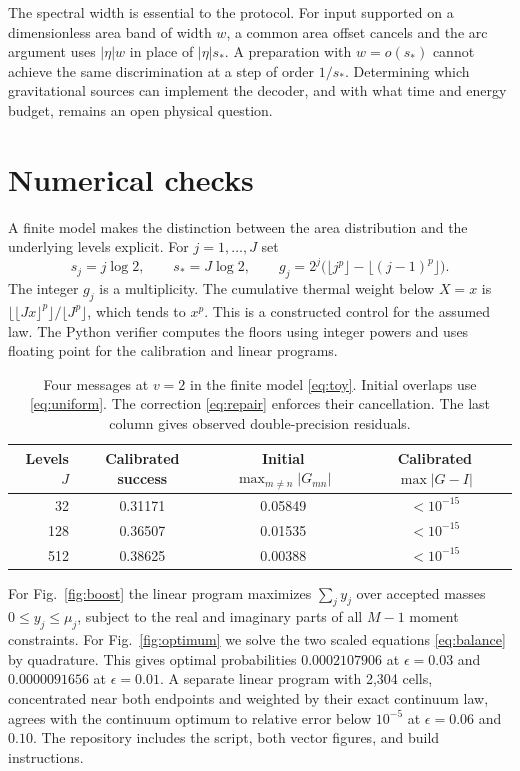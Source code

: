 \documentclass[11pt,letterpaper]{article}
\newcommand{\sg}{s_*}
\begin{document}
The spectral width is essential to the protocol. For input supported on a dimensionless area band of width $w$, a common area offset cancels and the arc argument uses $|\eta|w$ in place of $|\eta|\sg$. A preparation with $w=o(\sg)$ cannot achieve the same discrimination at a step of order $1/\sg$. Determining which gravitational sources can implement the decoder, and with what time and energy budget, remains an open physical question.

\section{Numerical checks}\label{sec:numerics}
A finite model makes the distinction between the area distribution and the underlying levels explicit. For $j=1,\ldots,J$ set
\begin{equation}\label{eq:toy}
 s_j=j\log2,\qquad \sg=J\log2,\qquad
 g_j=2^j\big(\lfloor j^p\rfloor-\lfloor(j-1)^p\rfloor\big).
\end{equation}
The integer $g_j$ is a multiplicity. The cumulative thermal weight below $X=x$ is $\lfloor\lfloor Jx\rfloor^p\rfloor/\lfloor J^p\rfloor$, which tends to $x^p$. This is a constructed control for the assumed law. The Python verifier computes the floors using integer powers and uses floating point for the calibration and linear programs.

\begin{table}[htbp]
\centering\small
\begin{tabular}{rccc}
\toprule
Levels $J$ & Calibrated success & Initial $\max_{m\ne n}|G_{mn}|$ & Calibrated $\max|G-I|$\\
\midrule
32  & 0.31171 & 0.05849 & $<10^{-15}$\\
128 & 0.36507 & 0.01535 & $<10^{-15}$\\
512 & 0.38625 & 0.00388 & $<10^{-15}$\\
\bottomrule
\end{tabular}
\caption{Four messages at $v=2$ in the finite model \eqref{eq:toy}. Initial overlaps use \eqref{eq:uniform}. The correction \eqref{eq:repair} enforces their cancellation. The last column gives observed double-precision residuals.}
\label{tab:finite}
\end{table}

For Fig.~\ref{fig:boost} the linear program maximizes $\sum_j y_j$ over accepted masses $0\leq y_j\leq\mu_j$, subject to the real and imaginary parts of all $M-1$ moment constraints. For Fig.~\ref{fig:optimum} we solve the two scaled equations \eqref{eq:balance} by quadrature. This gives optimal probabilities $0.0002107906$ at $\epsilon=0.03$ and $0.0000091656$ at $\epsilon=0.01$. A separate linear program with 2,304 cells, concentrated near both endpoints and weighted by their exact continuum law, agrees with the continuum optimum to relative error below $10^{-5}$ at $\epsilon=0.06$ and $0.10$. The repository includes the script, both vector figures, and build instructions.
\end{document}
